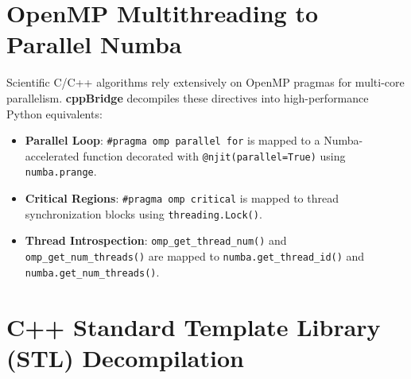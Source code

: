 \documentclass[11pt,a4paper]{article}
\theoremstyle{definition}
\begin{document}
\section{OpenMP Multithreading to Parallel Numba}

Scientific C/C++ algorithms rely extensively on OpenMP pragmas for multi-core parallelism. \textbf{cppBridge} decompiles these directives into high-performance Python equivalents:
\begin{itemize}
    \item \textbf{Parallel Loop}: \texttt{\#pragma omp parallel for} is mapped to a Numba-accelerated function decorated with \texttt{@njit(parallel=True)} using \texttt{numba.prange}.
    \item \textbf{Critical Regions}: \texttt{\#pragma omp critical} is mapped to thread synchronization blocks using \texttt{threading.Lock()}.
    \item \textbf{Thread Introspection}: \texttt{omp\_get\_thread\_num()} and \texttt{omp\_get\_num\_threads()} are mapped to \texttt{numba.get\_thread\_id()} and \texttt{numba.get\_num\_threads()}.
\end{itemize}

\section{C++ Standard Template Library (STL) Decompilation}
\end{document}
